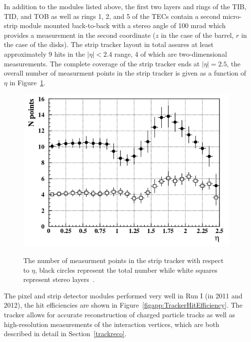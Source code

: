 In addition to the modules listed above, the first two layers and rings of the TIB, TID, and TOB as well as rings 1, 2, and 5 of the TECs contain a second micro-strip module mounted back-to-back with a stereo angle of 100 mrad which provides a measurement in the second coordinate ($z$ in the case of the barrel, $r$ in the case of the disks).  The strip tracker layout in total assures at least approximately 9 hits in the $|\eta| < 2.4$ range, 4 of which are two-dimensional measurements.  The complete coverage of the strip tracker ends at $|\eta| = 2.5$, the overall number of measurment points in the strip tracker is given as a function of $\eta$ in Figure~\ref{figapp:StripCoverage}.


\begin{figure}[!Hh]
       \centering
       \includegraphics[scale=0.6]{Figures/StripCoverage.png} \\
       \caption[The coverage of the strip tracker.]{The number of measurment points in the strip tracker with respect to $\eta$, black circles represent the total number while white squares represent stereo layers~\cite{CMSdetector}.}
\label{figapp:StripCoverage}
\end{figure}


The pixel and strip detector modules performed very well in Run I (in 2011 and 2012), the hit efficiencies are shown in Figure~\ref{figapp:TrackerHitEfficiency}.  The tracker allows for accurate reconstruction of charged particle tracks as well as high-resolution measurements of the interaction vertices, which are both described in detail in Section~\ref{trackreco}.  



